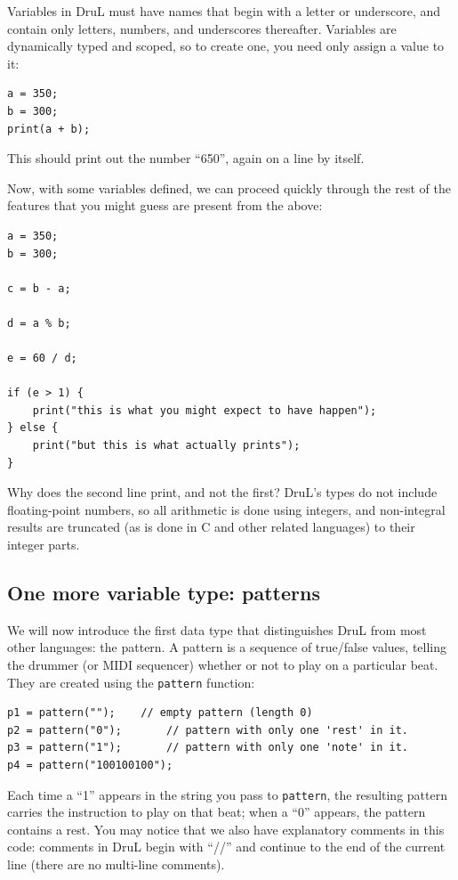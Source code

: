 Variables in DruL must have names that begin with a letter or underscore, and contain only letters, numbers, and underscores thereafter.  Variables are dynamically typed and scoped, so to create one, you need only assign a value to it:

\begin{lstlisting}
a = 350;
b = 300;
print(a + b);
\end{lstlisting}

This should print out the number ``650'', again on a line by itself.

Now, with some variables defined, we can proceed quickly through the rest of the features that
you might guess are present from the above:


\begin{lstlisting}
a = 350;
b = 300;

c = b - a;

d = a % b;

e = 60 / d;

if (e > 1) {
	print("this is what you might expect to have happen");
} else {
	print("but this is what actually prints");
}

\end{lstlisting}

Why does the second line print, and not the first?  DruL's types do not include floating-point numbers, so all arithmetic is done using integers, and non-integral results are truncated (as is done in C and other related languages) to their integer parts.

\subsection{One more variable type: patterns} \label{tu:pat1}

We will now introduce the first data type that distinguishes DruL from most other languages: the pattern.  A pattern is a sequence of true/false values, telling the drummer (or MIDI sequencer) whether or not to play on a particular beat.  They are created using the {\tt pattern} function:

\begin{lstlisting}
p1 = pattern("");	 // empty pattern (length 0)
p2 = pattern("0");       // pattern with only one 'rest' in it.
p3 = pattern("1");       // pattern with only one 'note' in it.
p4 = pattern("100100100");
\end{lstlisting}

Each time a ``1'' appears in the string you pass to {\tt pattern}, the resulting pattern carries the instruction to play on that beat; when a ``0'' appears, the pattern contains a rest.
You may notice that we also have explanatory comments in this code: comments in DruL begin with ``//'' and continue to the end of the current line (there are no multi-line comments).

